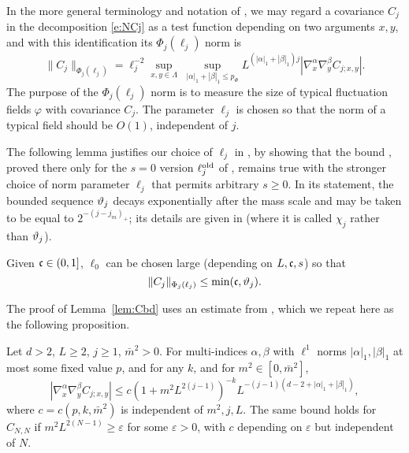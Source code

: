 In the more general terminology and notation of \cite{BS-rg-norm,BS-rg-IE},
we may regard a covariance $C_j$
in the decomposition \eqref{e:NCj}
as a test function depending on
two arguments $x,y$, and with this identification its $\Phi_j(\ell_j)$
norm is
\begin{equation}
    \label{e:Phinorm}
    \|C_j\|_{\Phi_{j}(\ell_j)}  =
    \ell_j^{-2}
    \sup_{x,y\in \Lambda}
    \;
    \sup_{|\alpha|_1 + |\beta|_1 \le p_\Phi}
    L^{(|\alpha|_1+  |\beta|_1)j}
    |\nabla_x^{\alpha} \nabla_y^{\beta} C_{j;x,y}|.
\end{equation}
The purpose of the $\Phi_j(\ell_j)$ norm is to measure the size of typical
fluctuation fields $\varphi$ with covariance $C_j$.
The parameter $\ell_j$ is chosen so that the norm of a typical field should
be $O(1)$, independent of $j$.

The following lemma justifies our choice of $\ell_j$
in , by showing that the
bound \cite[\eqref{IE-e:CLbd}]{BS-rg-IE}, proved there only for the $s=0$ version
$\ell_j^{\mathrm{old}}$ of ,
remains true with the stronger
choice of norm parameter $\ell_j$ that permits arbitrary $s \ge 0$.
In its statement, the bounded sequence $\vartheta_j$ decays exponentially after the
mass scale and may be taken to be equal to
$2^{-(j-j_m)_+}$; its details are given
in \cite[Section~\ref{IE-sec:frp}]{BS-rg-IE} (where it is called $\chi_j$ rather
than $\vartheta_j$).

\begin{lemma}
\label{lem:Cbd}
Given $\mathfrak{c} \in (0, 1]$, $\ell_0$ can be chosen large (depending on $L,\mathfrak{c},s$)
so that
\begin{equation}
\lbeq{Cbd}
\|C_j\|_{\Phi_{j}(\ell_j)} \leq \min(\ellconst, \chicCov_j).
\end{equation}
\end{lemma}



The proof of Lemma~\ref{lem:Cbd} uses an estimate from
\cite[Proposition~\ref{pt-prop:Cdecomp}]{BBS-rg-pt}, which we repeat here as
the following proposition.

\begin{prop}
\label{prop:Cdecomp}
  Let $d >2$, $L\geq 2$, $j \ge 1$, $\bar m^2 >0$.
  For multi-indices $\alpha,\beta$ with
  $\ell^1$ norms $|\alpha|_1,|\beta|_1$ at most
  some fixed value $p$,
  and for any $k$, and for $m^2 \in [0,\bar m^2]$,
  \begin{equation}
    \label{e:scaling-estimate}
    |\nabla_x^\alpha \nabla_y^\beta C_{j;x,y}|
    \leq c(1+m^2L^{2(j-1)})^{-k}
    L^{-(j-1)(d-2 +|\alpha|_1+|\beta|_1)},
  \end{equation}
  where $c=c(p,k,\bar m^2)$ is independent of $m^2,j,L$.
  The same bound holds for $C_{N,N}$ if
  $m^2L^{2(N-1)} \ge \varepsilon$ for some $\varepsilon >0$,
  with $c$ depending on $\varepsilon$ but independent of $N$.
\end{prop}

